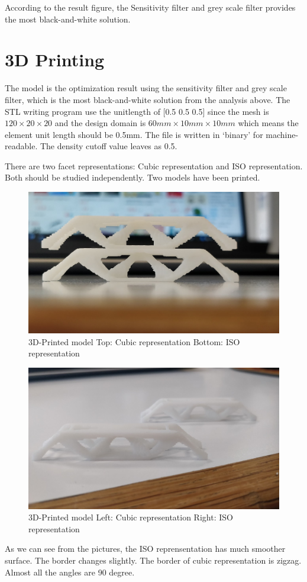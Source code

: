 \documentclass{article}
\begin{document}
According to the result figure, the Sensitivity filter and grey scale filter provides the most black-and-white solution.

\section{3D Printing}

The model is the optimization result using the sensitivity filter and grey scale filter, which is the most black-and-white solution from the analysis above. The STL writing program use the unitlength of [0.5 0.5 0.5] since the mesh is $120\times20\times20$ and the design domain is $60mm\times10mm\times10mm$ which means the element unit length should be 0.5mm. The file is written in ‘binary’ for machine-readable. The density cutoff value leaves as 0.5.


There are two facet representations: Cubic representation and ISO representation. Both should be studied independently. Two models have been printed.
\begin{figure}[!htb]
\centering
\includegraphics[width=1\textwidth]{CameraPhoto}
\caption{3D-Printed model	Top: Cubic representation	Bottom: ISO representation}
\end{figure}

\begin{figure}[!htb]
\centering
\includegraphics[width=1\textwidth]{3Dmodel}
\caption{3D-Printed model	Left: Cubic representation 	Right: ISO representation}
\end{figure}
\FloatBarrier
As we can see from the pictures, the ISO reprensentation has much smoother surface. The border changes slightly. The border of cubic representation is zigzag. Almost all the angles are 90 degree.
\end{document}
